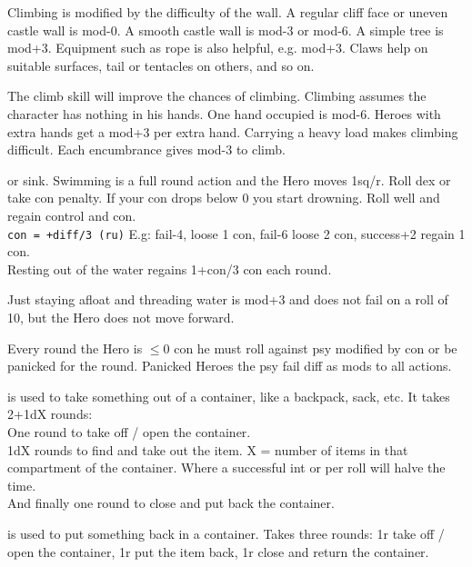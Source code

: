 Climbing is modified by the difficulty of the wall. A regular cliff face or uneven castle wall is mod-0. A smooth castle wall is mod-3 or mod-6. A simple tree is mod+3. Equipment such as rope is also helpful, e.g. mod+3. Claws help on suitable surfaces, tail or tentacles on others, and so on.

The climb skill will improve the chances of climbing. Climbing assumes the character has nothing in his hands. One hand occupied is mod-6. Heroes with extra hands get a mod+3 per extra hand. Carrying a heavy load makes climbing difficult. Each encumbrance gives mod-3 to climb.


 or sink. Swimming is a full round action and the Hero moves 1sq/r. Roll dex or take con penalty. If your con drops below 0 you start drowning. Roll well and regain control and con.\\
\verb|con = +diff/3 (ru)|
E.g: fail-4, loose 1 con, fail-6 loose 2 con, success+2 regain 1 con.\\
Resting out of the water regains 1+con/3 con each round.

Just staying afloat and threading water is mod+3 and does not fail on a roll of 10, but the Hero does not move forward.

Every round the Hero is $\leq$0 con he must roll against psy modified by con or be panicked for the round. Panicked Heroes the psy fail diff as mods to all actions.



 is used to take something out of a container, like a backpack, sack, etc. It takes 2+1dX rounds: \\
One round to take off / open the container. \\
1dX rounds to find and take out the item. X = number of items in that compartment of the container. Where a successful int or per roll will halve the time.\\
And finally one round to close and put back the container.


 is used to put something back in a container. Takes three rounds: 1r take off / open the container, 1r put the item back, 1r close and return the container.


\closeactionslist


